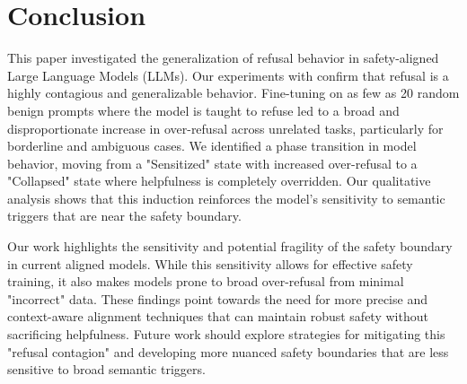 \section{Conclusion}

This paper investigated the generalization of refusal behavior in safety-aligned Large Language Models (LLMs). Our experiments with \qwen confirm that refusal is a highly contagious and generalizable behavior. Fine-tuning on as few as 20 random benign prompts where the model is taught to refuse led to a broad and disproportionate increase in over-refusal across unrelated tasks, particularly for borderline and ambiguous cases. We identified a phase transition in model behavior, moving from a "Sensitized" state with increased over-refusal to a "Collapsed" state where helpfulness is completely overridden. Our qualitative analysis shows that this induction reinforces the model's sensitivity to semantic triggers that are near the safety boundary.

Our work highlights the sensitivity and potential fragility of the safety boundary in current aligned models. While this sensitivity allows for effective safety training, it also makes models prone to broad over-refusal from minimal "incorrect" data. These findings point towards the need for more precise and context-aware alignment techniques that can maintain robust safety without sacrificing helpfulness. Future work should explore strategies for mitigating this "refusal contagion" and developing more nuanced safety boundaries that are less sensitive to broad semantic triggers.
